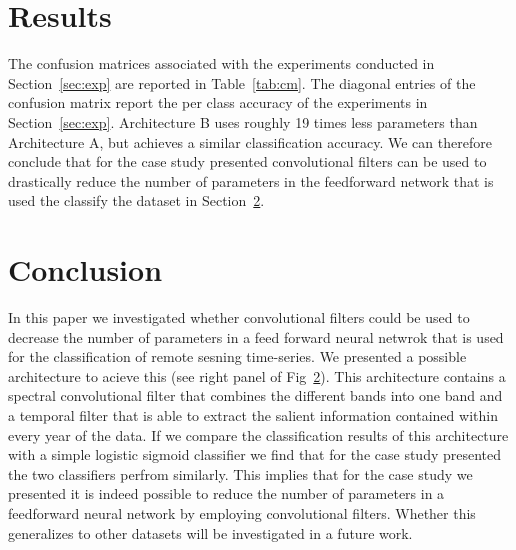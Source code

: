 \documentclass{article}
\begin{document}
\section{Results}
\label{sec:results}
The confusion matrices associated with the experiments conducted in Section~\ref{sec:exp} are reported in Table~\ref{tab:cm}. The diagonal entries of the confusion matrix report the per class accuracy of the experiments in Section~\ref{sec:exp}. Architecture B uses roughly 19 times less parameters than Architecture A, but achieves a similar classification accuracy. We can therefore conclude that for the case study presented  convolutional filters can be used to drastically reduce the number of parameters in the feedforward network that is used the classify the dataset in Section~\ref{}. 

\section{Conclusion}
In this paper we investigated whether convolutional filters could be used to decrease the number of parameters in a feed forward neural netwrok that is used for the classification of remote sesning time-series. We presented a possible architecture to acieve this (see right panel of Fig~\ref{}). This architecture
contains a spectral convolutional filter that combines the different bands into one band and a temporal filter that is able to extract the salient information contained within every year of the data. If we compare the classification results of this architecture with a simple logistic sigmoid classifier we find that for the case study presented the two classifiers perfrom similarly. This implies that for the case study we presented it is indeed possible to reduce the number of parameters in a feedforward neural network by employing convolutional filters. Whether this generalizes to other datasets will be investigated in a future work.  
\end{document}
